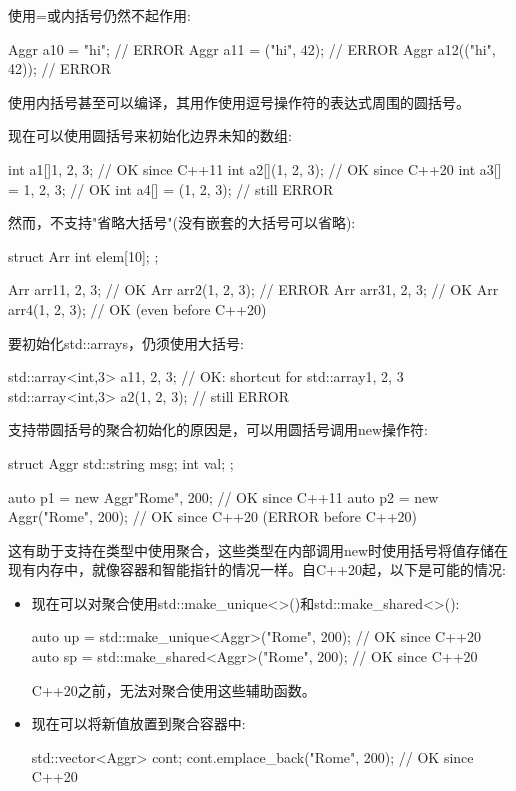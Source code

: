 使用=或内括号仍然不起作用:

\begin{cpp}
Aggr a10 = "hi"; // ERROR
Aggr a11 = ("hi", 42); // ERROR
Aggr a12(("hi", 42)); // ERROR
\end{cpp}

使用内括号甚至可以编译，其用作使用逗号操作符的表达式周围的圆括号。

现在可以使用圆括号来初始化边界未知的数组:

\begin{cpp}
int a1[]{1, 2, 3}; // OK since C++11
int a2[](1, 2, 3); // OK since C++20
int a3[] = {1, 2, 3}; // OK
int a4[] = (1, 2, 3); // still ERROR
\end{cpp}

然而，不支持"省略大括号"(没有嵌套的大括号可以省略):

\begin{cpp}
struct Arr {
	int elem[10];
};

Arr arr1{1, 2, 3}; // OK
Arr arr2(1, 2, 3); // ERROR
Arr arr3{{1, 2, 3}}; // OK
Arr arr4({1, 2, 3}); // OK (even before C++20)
\end{cpp}

要初始化std::arrays，仍须使用大括号:

\begin{cpp}
std::array<int,3> a1{1, 2, 3}; // OK: shortcut for std::array{{1, 2, 3}}
std::array<int,3> a2(1, 2, 3); // still ERROR
\end{cpp}


支持带圆括号的聚合初始化的原因是，可以用圆括号调用new操作符:

\begin{cpp}
struct Aggr {
	std::string msg;
	int val;
};

auto p1 = new Aggr{"Rome", 200}; // OK since C++11
auto p2 = new Aggr("Rome", 200); // OK since C++20 (ERROR before C++20)
\end{cpp}

这有助于支持在类型中使用聚合，这些类型在内部调用new时使用括号将值存储在现有内存中，就像容器和智能指针的情况一样。自C++20起，以下是可能的情况:

\begin{itemize}
\item
现在可以对聚合使用std::make\_unique<>()和std::make\_shared<>():

\begin{cpp}
auto up = std::make_unique<Aggr>("Rome", 200); // OK since C++20
auto sp = std::make_shared<Aggr>("Rome", 200); // OK since C++20
\end{cpp}

C++20之前，无法对聚合使用这些辅助函数。

\item
现在可以将新值放置到聚合容器中:

\begin{cpp}
std::vector<Aggr> cont;
cont.emplace_back("Rome", 200); // OK since C++20
\end{cpp}
\end{itemize}

